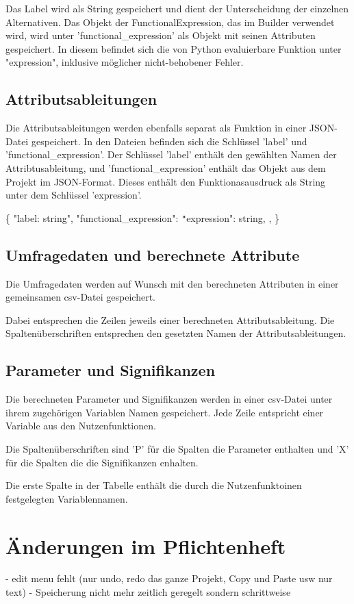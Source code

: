 \documentclass{article}
\begin{document}
Das Label wird als String gespeichert und dient der Unterscheidung der einzelnen Alternativen. Das Objekt der FunctionalExpression, das im Builder verwendet wird, wird unter 'functional\_expression' als Objekt mit seinen Attributen gespeichert. In diesem befindet sich die von Python evaluierbare Funktion unter "expression", inklusive möglicher nicht-behobener Fehler.

\subsection{Attributsableitungen}
Die Attributsableitungen werden ebenfalls separat als Funktion in einer JSON-Datei gespeichert. In den Dateien befinden sich die Schlüssel 'label' und 'functional\_expression'. Der Schlüssel 'label' enthält den gewählten Namen der Attribtusableitung, und 'functional\_expression' enthält das Objekt aus dem Projekt im JSON-Format. Dieses enthält den Funktionasausdruck als String unter dem Schlüssel 'expression'.

\newline
\{ \newline
    "label: string", \newline
    "functional\_expression": {\newline
        \texttt{"}expression": string, \newline
    }, \newline
\} \newline
\newline


\subsection{Umfragedaten und berechnete Attribute}
Die Umfragedaten werden auf Wunsch mit den berechneten Attributen in einer gemeinsamen csv-Datei gespeichert. 

Dabei entsprechen die Zeilen jeweils einer berechneten Attributsableitung. Die Spaltenüberschriften entsprechen den gesetzten Namen der Attributsableitungen. 

\subsection{Parameter und Signifikanzen}
Die berechneten Parameter und Signifikanzen werden in einer csv-Datei unter ihrem zugehörigen Variablen Namen gespeichert. Jede Zeile entspricht einer Variable aus den Nutzenfunktionen.

Die Spaltenüberschriften sind 'P' für die Spalten die Parameter enthalten und 'X' für die Spalten die die Signifikanzen enhalten. 

Die erste Spalte in der Tabelle enthält die durch die Nutzenfunktoinen festgelegten Variablennamen.


\section{Änderungen im Pflichtenheft}
- edit menu fehlt (nur undo, redo das ganze Projekt, Copy und Paste usw nur text)
- Speicherung nicht mehr zeitlich geregelt sondern schrittweise
\end{document}
